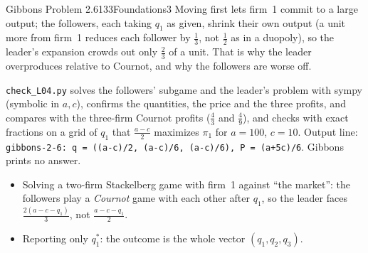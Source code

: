 \begin{exsol}{Gibbons Problem 2.6}{133}{Foundations}{3}
\interp Moving first lets firm~1 commit to a large output; the followers, each taking $q_1$ as given, shrink
their own output (a unit more from firm~1 reduces each follower by $\frac13$, not $\frac12$ as in a duopoly), so
the leader's expansion crowds out only $\frac23$ of a unit. That is why the leader overproduces relative to
Cournot, and why the followers are worse off.

\verify \texttt{check\_L04.py} solves the followers' subgame and the leader's problem with sympy
(symbolic in $a, c$), confirms the quantities, the price and the three profits, and compares with the
three-firm Cournot profits ($\frac{4}{3}$ and $\frac{4}{9}$), and checks with exact fractions on a grid of $q_1$ that
$\frac{a-c}{2}$ maximizes $\pi_1$ for $a = 100$, $c = 10$. Output line:
\texttt{gibbons-2-6: q = ((a-c)/2, (a-c)/6, (a-c)/6), P = (a+5c)/6}. Gibbons prints no answer.

\mistakes
\begin{itemize}
  \item Solving a two-firm Stackelberg game with firm~1 against ``the market'': the followers play a
  \emph{Cournot} game with each other after $q_1$, so the leader faces $\frac{2(a-c-q_1)}{3}$, not
  $\frac{a-c-q_1}{2}$.
  \item Reporting only $q_1^*$: the outcome is the whole vector $(q_1, q_2, q_3)$.
\end{itemize}

\end{exsol}
